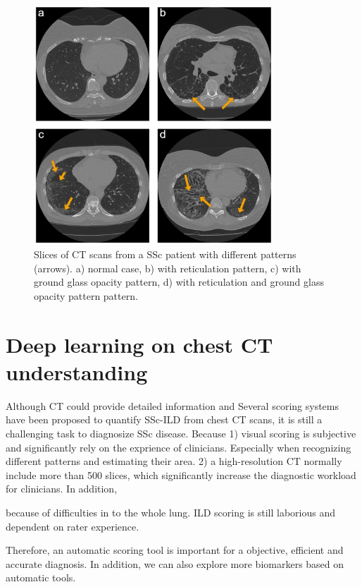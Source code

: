 \begin{figure}[tb]
    \centering
    \includegraphics[width=0.8\textwidth]{Introduction/figures/ct_samples.png}
    \caption{Slices of CT scans from a SSc patient with different patterns (arrows). a) normal case, b) with reticulation pattern, c) with ground glass opacity pattern, d) with reticulation and ground glass opacity pattern pattern.}
    \label{fig:chap1_ct_samples}
\end{figure}



\section{Deep learning on chest CT understanding}
Although CT could provide detailed information and Several scoring systems have been proposed to quantify SSc-ILD from chest CT scans, it is still a challenging task to diagnosize SSc disease. Because 1) visual scoring is subjective and significantly rely on the exprience of clinicians. Especially when recognizing different patterns and estimating their area. 2) a high-resolution CT normally include more than 500 slices, which significantly increase the diagnostic workload for clinicians. In addition, 

because of difficulties in  to the whole lung. ILD scoring is still laborious and dependent on rater experience. 

Therefore, an automatic scoring tool is important for a objective, efficient and accurate diagnosis. In addition, we can also explore more biomarkers based on automatic tools.


